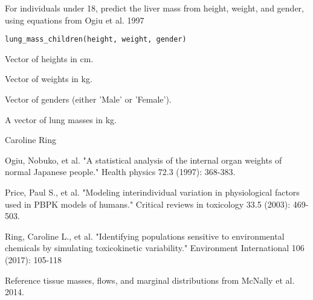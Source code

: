 \documentclass[a4paper]{book}
\begin{document}
%
\begin{Description}\relax
For individuals under 18, predict the liver mass from height, weight, and
gender, using equations from Ogiu et al. 1997
\end{Description}
%
\begin{Usage}
\begin{verbatim}
lung_mass_children(height, weight, gender)
\end{verbatim}
\end{Usage}
%
\begin{Arguments}
\begin{ldescription}
\item[\code{height}] Vector of heights in cm.

\item[\code{weight}] Vector of weights in kg.

\item[\code{gender}] Vector of genders (either 'Male' or 'Female').
\end{ldescription}
\end{Arguments}
%
\begin{Value}
A vector of lung masses in kg.
\end{Value}
%
\begin{Author}\relax
Caroline Ring
\end{Author}
%
\begin{References}\relax
Ogiu, Nobuko, et al. "A statistical analysis of the internal 
organ weights of normal Japanese people." Health physics 72.3 (1997): 368-383.

Price, Paul S., et al. "Modeling interindividual variation in physiological 
factors used in PBPK models of humans." Critical reviews in toxicology 33.5 
(2003): 469-503.

Ring, Caroline L., et al. "Identifying populations sensitive to
environmental chemicals by simulating toxicokinetic variability."
Environment International 106 (2017): 105-118
\end{References}
%
\begin{Description}\relax
Reference tissue masses, flows, and marginal distributions from McNally et
al. 2014.
\end{Description}
\end{document}
